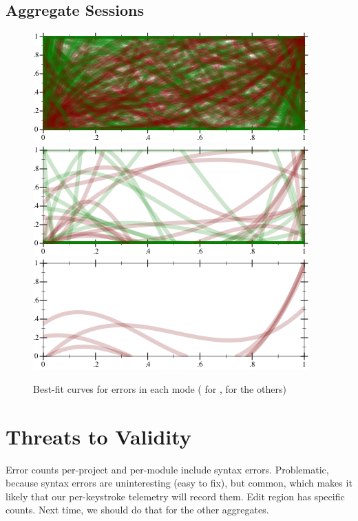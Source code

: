 \documentclass[
  acmsmall,
  review,
  anonymous,
]{acmart}
\begin{document}
\subsection{Aggregate Sessions}

\begin{figure}[t]
  \includegraphics[width=0.8\columnwidth]{img/fit-nocheck-Force.pdf}
  \includegraphics[width=0.8\columnwidth]{img/fit-nonstrict-TypeE.pdf}
  \includegraphics[width=0.8\columnwidth]{img/fit-strict-TypeE.pdf}
  \caption{Best-fit curves for errors in each mode ( for \mnocheck{},  for the others)}
  \label{f:scribbles}
\end{figure}



\section{Threats to Validity}
\label{s:threats}

Error counts per-project and per-module include syntax errors.
Problematic, because syntax errors are uninteresting (easy to fix),
but common, which makes it likely that our per-keystroke telemetry will record them.
Edit region has specific counts.
Next time, we should do that for the other aggregates.
\end{document}
